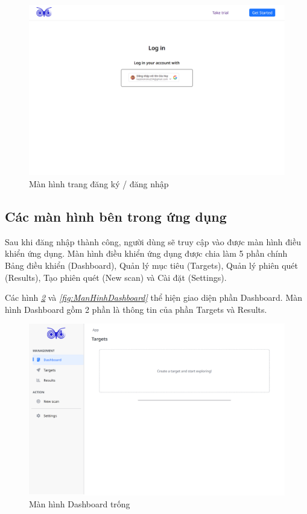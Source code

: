 \begin{figure}[H]
      \centering
      \includegraphics[width=\textwidth]{applied-thesis-chapters/chapter-6/Màn hình trang đăng nhập đăng ký.png}
      \caption{Màn hình trang đăng ký / đăng nhập}
      \label{fig:ManHinhTrangDangKyDangNhap}
\end{figure}

\subsection{Các màn hình bên trong ứng dụng}

\tab Sau khi đăng nhập thành công, người dùng sẽ truy cập vào được màn hình điều khiển ứng dụng.
Màn hình điều khiển ứng dụng được chia làm 5 phần chính Bảng điều khiển (Dashboard), Quản lý mục tiêu (Targets), Quản lý phiên quét (Results), Tạo phiên quét (New scan) và Cài đặt (Settings).

\tab \tab Các hình \textit{\ref{fig:ManHinhDashboardTrong} }
và \textit{\ref{fig:ManHinhDashboard} } thể hiện giao diện phần Dashboard.
Màn hình Dashboard gồm 2 phần là thông tin của phần Targets và Results.

\begin{figure}[H]
      \centering
      \includegraphics[width=\textwidth]{applied-thesis-chapters/chapter-6/Màn hình Dashboard trống.png}
      \caption{Màn hình Dashboard trống}
      \label{fig:ManHinhDashboardTrong}
\end{figure}

